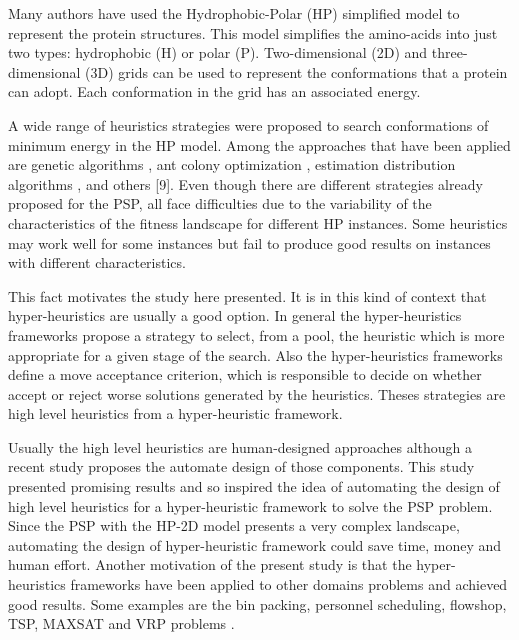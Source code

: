 \documentclass[conference]{IEEEtran}
\begin{document}
Many authors \cite{custodio2004investigation,hsu2003growth,lin2011protein,unger1993genetic,santana2008component,custodio2014multiple, garza2012locality} have used the Hydrophobic-Polar (HP) \cite{lau1989lattice} simplified model to represent the protein structures. This model simplifies the amino-acids into just two types: hydrophobic (H) or polar (P). Two-dimensional (2D) and three-dimensional (3D) grids can be used to represent the conformations that a protein can adopt. Each conformation in the grid has an associated energy. 


A wide range of heuristics strategies were proposed to search  conformations of minimum energy in the HP model. Among the approaches that have been applied are genetic algorithms \cite{unger1993genetic}, ant colony optimization \cite{shmygelska2002ant, shmygelska2003improved}, estimation distribution algorithms \cite{santana2008component}, and others [9]. Even though there are different strategies already proposed for the PSP, all face difficulties due to the variability of the characteristics of the fitness landscape for different HP instances.  Some heuristics may work well for some instances but fail to produce good results on instances with different characteristics. 
  
   This fact motivates the study here presented. It is in this kind of context that hyper-heuristics are usually a good option. In general the hyper-heuristics frameworks propose a strategy to select, from a pool, the heuristic which is more appropriate for a given stage of the search. Also the hyper-heuristics frameworks define a move acceptance criterion, which is responsible to decide on whether accept or reject worse solutions generated by the heuristics. Theses strategies are high level heuristics from a hyper-heuristic framework. 
 
 Usually the high level heuristics are human-designed approaches although a recent study \cite{sabar2015automatic} proposes the automate design of those components. This study presented promising results and so inspired the idea of automating the design of high level heuristics for a hyper-heuristic framework to solve the PSP problem. Since the PSP with the HP-2D model presents a very complex landscape, automating the design of hyper-heuristic framework could save time, money and human effort. Another motivation of the present study is that the hyper-heuristics frameworks have been applied to other domains problems and achieved good results. Some examples are the bin packing, personnel scheduling, flowshop, TSP, MAXSAT and VRP problems \cite{sabar2015automatic}.
 
\end{document}
